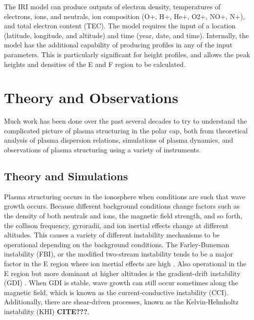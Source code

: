 The IRI model can produce outputs of electron density, temperatures of electrons, ions, and neutrals, ion composition (O+, H+, He+, O2+, NO+, N+), and total electron content (TEC).  The model requires the input of a location (latitude, longitude, and altitude) and time (year, date, and time).  Internally, the model has the additional capability of producing profiles in any of the input parameters.  This is particularly significant for height profiles, and allows the peak heights and densities of the E and F region to be calculated.


\section{Theory and Observations}
Much work has been done over the past several decades to try to understand the complicated picture of plasma structuring in the polar cap, both from theoretical analysis of plasma dispersion relations, simulations of plasma dynamics, and observations of plasma structuring using a variety of instruments.

\subsection{Theory and Simulations}

Plasma structuring occurs in the ionosphere when conditions are such that wave growth occurs.  Because different background conditions change factors such as the density of both neutrals and ions, the magnetic field strength, and so forth, the collison frequency, gyroradii, and ion inertial effects change at different altitudes.  This causes a variety of different instability mechanisms to be operational depending on the background conditions.  The Farley-Buneman instability (FBI), or the modified two-stream instability tends to be a major factor in the E region where ion inertial effects are high \citep{Farley1963,Buneman1963}.  Also operational in the E region but more dominant at higher altitudes is the gradient-drift instability (GDI) \citep{Simon1963,Hoh1963,Linson1970}.  When GDI is stable, wave growth can still occur sometimes along the magnetic field, which is known as the current-conductive instability (CCI).  Additionally, there are shear-driven processes, known as the Kelvin-Helmholtz instability (KHI) \textbf{CITE???}.

